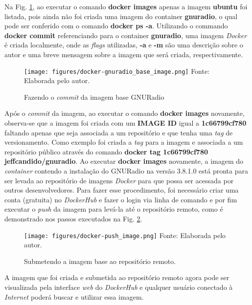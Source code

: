 \documentclass[
  12pt,				%
  openright,			%
  twoside,			%
  a4paper,			%
  english,			%
  french,				%
  spanish,			%
  brazil,				%
  ]{abntex2}
\begin{document}
Na Fig. \ref{fig:docker-gnuradio_base_image}, ao executar o comando \textbf{docker images} apenas a imagem \textbf{ubuntu}
foi listada, pois ainda não foi criada uma imagem do container \textbf{gnuradio}, o qual pode ser conferido com o comando
\textbf{docker ps -a}. Utilizando o commando \textbf{docker commit} referenciando para o container \textbf{gnuradio}, uma imagem
\textit{Docker} é criada localmente, onde as \textit{flags} utilizadas, \textbf{-a} e \textbf{-m} são uma descrição
sobre o autor e uma breve mensagem sobre a imagem que será criada, respectivamente.

\begin{figure}[!htb]
  \centering
  \caption{Fazendo o \textit{commit} da imagem base GNURadio}
  \texttt{[image: figures/docker-gnuradio\_base\_image.png]}
  Fonte: Elaborada pelo autor.
  \label{fig:docker-gnuradio_base_image}
\end{figure}

Após o \textit{commit} da imagem, ao executar o comando \textbf{docker images} novamente, observa-se que a imagem foi criada com
um \textbf{IMAGE ID} igual a \textbf{1c66799cf780} faltando apenas que seja associada a um repositório e que tenha uma \textit{tag} de versionamento.
Como exemplo foi criada a \textit{tag} para a imagem e associada a um repositório público através do comando \textbf{docker tag 1c66799cf780 jeffcandido/gnuradio}.
Ao executar \textbf{docker images} novamente, a imagem do \textit{container} contendo a instalação do GNURadio na versão 3.8.1.0
está pronta para ser levada ao repositório de imagens \textit{Docker} para que possa ser acessada por outros desenvolvedores. Para
fazer esse procedimento, foi necessário criar uma conta (gratuita) no \textit{DockerHub} e fazer o login via linha de comando e por fim
executar o \textit{push} da imagem para levá-la até o repositório remoto, como é demonstrado nos passos executados na Fig. \ref{fig:docker-push_image}.

\begin{figure}[!htb]
  \centering
  \caption{Submetendo a imagem base ao repositório remoto.}
  \texttt{[image: figures/docker-push\_image.png]}
  Fonte: Elaborada pelo autor.
  \label{fig:docker-push_image}
\end{figure}

A imagem que foi criada e submetida ao repositório remoto agora pode ser visualizada pela interface \textit{web} do \textit{DockerHub} e qualquer usuário
conectado à \textit{Internet} poderá buscar e utilizar essa imagem.
\end{document}
